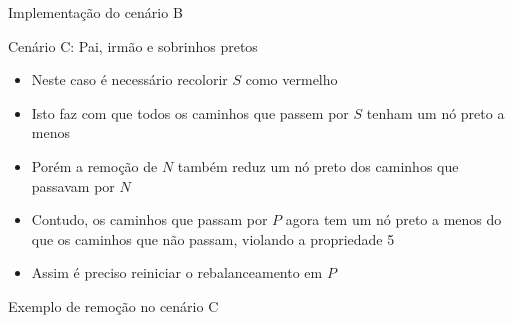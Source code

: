 \begin{frame}[fragile]{Implementação do cenário B}
\end{frame}

\begin{frame}[fragile]{Cenário C: Pai, irmão e sobrinhos pretos}

    \begin{itemize}
        \item Neste caso é necessário recolorir $S$ como vermelho

        \item Isto faz com que todos os caminhos que passem por $S$ tenham um nó preto a menos

        \item Porém a remoção de $N$ também reduz um nó preto dos caminhos que passavam por $N$

        \item Contudo, os caminhos que passam por $P$ agora tem um nó preto a menos do que os
            caminhos que não passam, violando a propriedade 5

        \item Assim é preciso reiniciar o rebalanceamento em $P$
    \end{itemize}

\end{frame}

\begin{frame}[fragile]{Exemplo de remoção no cenário C}


\end{frame}

